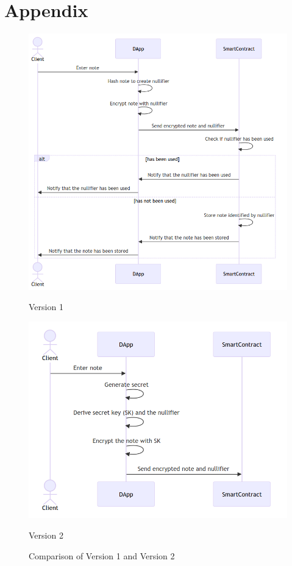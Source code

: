 \documentclass[twocolumn,10pt]{article}
\begin{document}
\onecolumn

\section*{Appendix}

\begin{figure}[h]
    \centering
    \begin{minipage}[b]{0.48\textwidth}
        \centering
        \includegraphics[width=\linewidth]{./figures/version1.png}
        \caption{Version 1}
        \label{fig:version1}
    \end{minipage}
    \hfill
    \begin{minipage}[b]{0.48\textwidth}
        \centering
        \includegraphics[width=\linewidth]{./figures/version2.png}
        \caption{Version 2}
        \label{fig:version2}
    \end{minipage}
    \caption{Comparison of Version 1 and Version 2}
    \label{fig:versions_comparison}
\end{figure}
\end{document}
